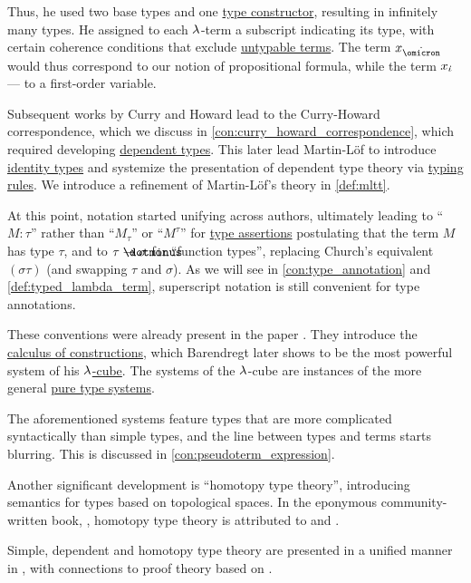 \begin{remark}
  Thus, he used two base types and one \hyperref[con:type_constructor]{type constructor}, resulting in infinitely many types. He assigned to each \( {\mathrm \lambda} \)-term a subscript indicating its type, with certain coherence conditions that exclude \hyperref[def:typability]{untypable terms}. The term \( x_{\syn\omicron} \) would thus correspond to our notion of propositional formula, while the term \( x_{\dot{\iota}} \) --- to a first-order variable.

  Subsequent works by Curry and Howard lead to the Curry-Howard correspondence, which we discuss in \cref{con:curry_howard_correspondence}, which required developing \hyperref[con:dependent_type]{dependent types}. This later lead Martin-Löf to introduce \hyperref[def:identity_type]{identity types} and systemize the presentation of dependent type theory via \hyperref[con:typing_rule]{typing rules}. We introduce a refinement of Martin-L\"of's theory in \cref{def:mltt}.

  At this point, notation started unifying across authors, ultimately leading to \enquote{\( M: \tau \)} rather than \enquote{\( M_\tau \)} or \enquote{\( M^\tau \)} for \hyperref[def:type_assertion]{type assertions} postulating that the term \( M \) has type \( \tau \), and to \( \tau \synimplies \sigma \) for \enquote{function types}, replacing Church's equivalent \( (\sigma\tau) \) (and swapping \( \tau \) and \( \sigma \)). As we will see in \cref{con:type_annotation} and \cref{def:typed_lambda_term}, superscript notation is still convenient for type annotations.

  These conventions were already present in the paper . They introduce the \hyperref[def:lambda_cube/combinations]{calculus of constructions}, which Barendregt later shows to be the most powerful system of his \hyperref[def:lambda_cube]{\( {\mathrm \lambda} \)-cube}. The systems of the \( {\mathrm \lambda} \)-cube are instances of the more general \hyperref[def:pure_type_system]{pure type systems}.

  The aforementioned systems feature types that are more complicated syntactically than simple types, and the line between types and terms starts blurring. This is discussed in \cref{con:pseudoterm_expression}.

  Another significant development is \enquote{homotopy type theory}, introducing semantics for types based on topological spaces. In the eponymous community-written book, \cite{UnivalentFoundationsProgram2024OctoberHoTT}, homotopy type theory is attributed to \cite{Voevodski2006HoTT} and \cite{AwodeyWarren2009HoTT}.
\end{remark}
\begin{comments}
  \item Simple, dependent and homotopy type theory are presented in a unified manner in \cite{Mimram2020ProgramEqualsProof}, with connections to proof theory based on .
\end{comments}

